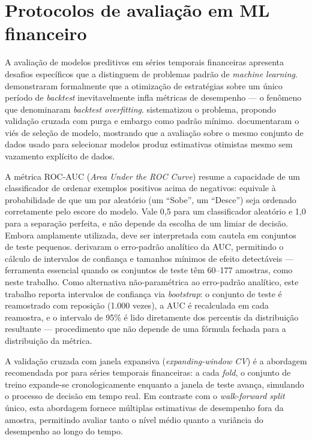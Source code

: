 \section{Protocolos de avaliação em ML financeiro}

A avaliação de modelos preditivos em séries temporais financeiras apresenta desafios específicos que a distinguem de problemas padrão de \textit{machine learning}.  demonstraram formalmente que a otimização de estratégias sobre um único período de \textit{backtest} inevitavelmente infla métricas de desempenho --- o fenômeno que denominaram \textit{backtest overfitting}.  sistematizou o problema, propondo validação cruzada com purga e embargo como padrão mínimo.  documentaram o viés de seleção de modelo, mostrando que a avaliação sobre o mesmo conjunto de dados usado para selecionar modelos produz estimativas otimistas mesmo sem vazamento explícito de dados.

A métrica ROC-AUC (\textit{Area Under the ROC Curve}) resume a capacidade de um classificador de ordenar exemplos positivos acima de negativos: equivale à probabilidade de que um par aleatório (um ``Sobe'', um ``Desce'') seja ordenado corretamente pelo escore do modelo. Vale 0,5 para um classificador aleatório e 1,0 para a separação perfeita, e não depende da escolha de um limiar de decisão. Embora amplamente utilizada, deve ser interpretada com cautela em conjuntos de teste pequenos.  derivaram o erro-padrão analítico da AUC, permitindo o cálculo de intervalos de confiança e tamanhos mínimos de efeito detectáveis --- ferramenta essencial quando os conjuntos de teste têm 60--177 amostras, como neste trabalho. Como alternativa não-paramétrica ao erro-padrão analítico, este trabalho reporta intervalos de confiança via \textit{bootstrap}: o conjunto de teste é reamostrado com reposição (1.000 vezes), a AUC é recalculada em cada reamostra, e o intervalo de 95\% é lido diretamente dos percentis da distribuição resultante --- procedimento que não depende de uma fórmula fechada para a distribuição da métrica.

A validação cruzada com janela expansiva (\textit{expanding-window CV}) é a abordagem recomendada por  para séries temporais financeiras: a cada \textit{fold}, o conjunto de treino expande-se cronologicamente enquanto a janela de teste avança, simulando o processo de decisão em tempo real. Em contraste com o \textit{walk-forward split} único, esta abordagem fornece múltiplas estimativas de desempenho fora da amostra, permitindo avaliar tanto o nível médio quanto a variância do desempenho ao longo do tempo.


